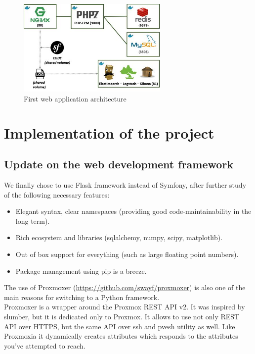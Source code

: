 \begin{figure}[!h]
  \centering
  \includegraphics[width=0.65\textwidth]{images/symfony-example.jpg}
  \caption{First web application architecture}
  \label{Symfony}
\end{figure}

\pagebreak

\section{Implementation of the project}

\subsection{Update on the web development framework}

We finally chose to use Flask framework instead of Symfony, after further study of the following necessary features:
\begin{itemize}
    \item Elegant syntax, clear namespaces (providing good code-maintainability in the long term).
    \item Rich ecosystem and libraries (sqlalchemy, numpy, scipy, matplotlib).
    \item Out of box support for everything (such as large floating point numbers).
    \item Package management using pip is a breeze.
\end{itemize}

The use of Proxmoxer (\url{https://github.com/swayf/proxmoxer}) is also one of the main reasons for switching to a Python framework.
\\

Proxmoxer is a wrapper around the Proxmox REST API v2.
It was inspired by slumber, but it is dedicated only to Proxmox. It allows to use not only REST API over HTTPS, but the same API over ssh and pvesh utility as well.
Like Proxmoxia it dynamically creates attributes which responds to the attributes you've attempted to reach.

